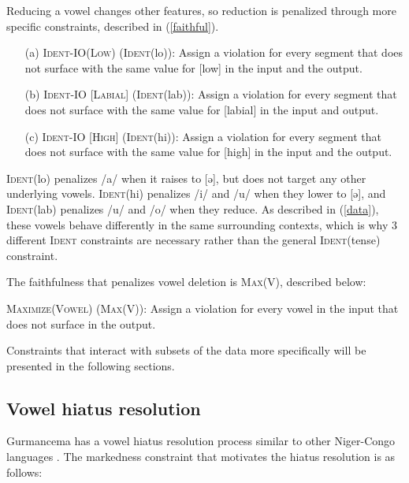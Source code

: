 \documentclass[output=paper,newtxmath,modfonts,nonflat,draftmode]{langsci/langscibook}
\begin{document}
Reducing a vowel changes other features, so reduction is penalized through more specific constraints, described in 
(\ref{faithful}).


\ea \label{faithful}
\begin{enumerate}

\item[(a)]
\textsc{Ident-IO(Low)} (\textsc{Ident}(lo)): Assign a violation for every segment that does not surface with the same value for [low] in the input and the output.

\item[(b)]\textsc{Ident-IO [Labial]} (\textsc{Ident}(lab)): Assign a violation for every segment that 	does not surface with the same value for [labial] in the input and output.

\item[(c)] \textsc{Ident-IO [High]} (\textsc{Ident}(hi)):  Assign a violation for every segment that does 	not surface with the same value for [high] in the input and the output. 
 
 \end{enumerate}
\z 

 \textsc{Ident}(lo) penalizes /a/ when it raises to [ə], but does not target any other underlying vowels. \textsc{Ident}(hi) penalizes /i/ and /u/ when they lower to [ə], and \textsc{Ident}(lab) penalizes /u/ and /o/ when they reduce. As described in (\ref{data}), these vowels behave differently in the same surrounding contexts, which is why 3 different \textsc{Ident} constraints are necessary rather than the general \textsc{Ident}(tense) constraint. 
 
The faithfulness that penalizes vowel deletion is \textsc{Max}(V), described below:
  
\ea
\textsc{Maximize(Vowel)} (\textsc{Max(V)}): Assign a violation for every vowel in the input 	that does not surface in the output. 
\z

Constraints that interact with subsets of the data more specifically will be 
presented in the following sections. 

\subsection{Vowel hiatus resolution}

Gurmancema has a vowel hiatus resolution process similar to other Niger-Congo languages \citep{Casali1997}. 
The markedness constraint that motivates the hiatus resolution is as follows:
\end{document}
